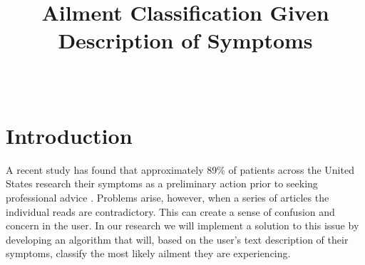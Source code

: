 \documentclass[12pt, final, onecolumn, comsoc, conference]{IEEEtran}
\begin{document}
\title{Ailment Classification Given Description of Symptoms}
\author{
	\\
}

\maketitle
\section{Introduction} A recent study has found that approximately
89\% of patients across the United States research their symptoms as a
preliminary action prior to seeking professional advice \cite{guarino_2019}. Problems arise,
however, when a series of articles the individual reads are contradictory. This
can create a sense of confusion and concern in the user. In our research we will
implement a solution to this issue by developing an algorithm that will, based
on the user's text description of their symptoms, classify the most likely
ailment they are experiencing.
\end{document}
